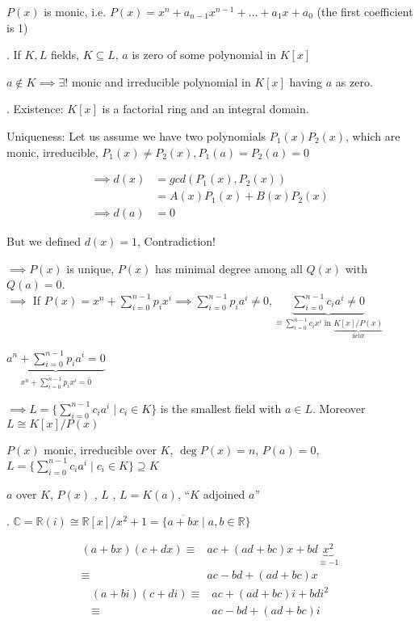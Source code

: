$P(x)$ is monic, i.e. $P(x) = x^n + a_{n-1}x^{n-1} + \ldots + a_1 x + a_0$ (the first coefficient is 1)

\Theorem.
If $K,L$ fields, $K\subseteq L$, $a$ is zero of some polynomial in $K[x]$

$a \notin K \implies \exists!$ monic and irreducible polynomial in $K[x]$ having $a$ as zero.

\Proof.
Existence: $K[x]$ is a factorial ring and an integral domain.

Uniqueness: Let us assume we have two polynomials $P_1(x) P_2(x)$, which are monic, irreducible, $P_1(x) \neq P_2(x), P_1(a) = P_2(a) = 0$

\begin{align*}
  \implies d(x) &= gcd(P_1(x), P_2(x))\\
                &= A(x) P_1(x) + B(x) P_2(x) \\
  \implies d(a) &= 0
\end{align*}

But we defined $d(x) = 1$, Contradiction!

$\implies P(x)$ is unique, $P(x)$ has minimal degree among all $Q(x)$ with $Q(a) = 0$. \\
$\implies$ If $P(x) = x^n + \sum_{i=0}^{n-1} p_i x^i \implies \sum_{i=0}^{n-1} p_i a^i \neq 0, \underbrace{\sum_{i=0}^{n-1} c_i a^i \neq 0}_{\hat{=} \sum_{i=0}^{n-1} c_i x^i \text{ in } \underbrace{K[x]/P(x)}_{\text{field!}}}$

$\underbrace{a^n + \sum_{i=0}^{n-1} p_i a^i = 0}_{\overline{x^n + \sum_{i=0}^{n-1} p_i x^i} = \bar{0}}$

$\implies L = \{ \sum_{i=0}^{n-1} c_i a^i \mid c_i \in K\}$ is the smallest field with $a \in L$. Moreover $L \cong K[x]/P(x)$

\begin{definition}
  $P(x)$ monic, irreducible over $K$, $\deg P(x) = n$, $P(a) = 0$,
  $L = \{ \sum_{i=0}^{n-1} c_i a^i\mid c_i \in K \} \supseteq K$

  $a$  over $K$, $P(x)$ , $L$ , $L = K(a)$, ``$K$ adjoined $a$''
\end{definition}

\Example.
$\mathbb{C} = \mathbb{R}(i) \cong \mathbb{R}[x] / x^2 +1 = \{\overline{a+bx} \mid a,b \in \mathbb{R} \}$

\begin{align*}
  (a + bx)(c+dx)
  \equiv & ac + (ad+bc)x + bd \underbrace{x^2}_{\equiv -1} \\
  \equiv & ac - bd + (ad+bc)x
\end{align*}
\begin{align*}
  (a + bi)(c+di)
  \equiv & ac + (ad+bc)i + bd i^2 \\
  \equiv & ac - bd + (ad+bc)i
\end{align*}

